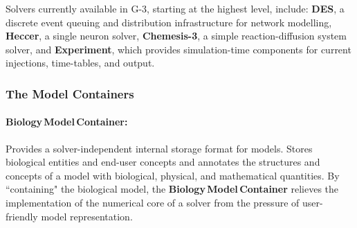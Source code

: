\documentclass[11pt,3p,twocolumn]{JMN}
\begin{document}
Solvers currently available in G-3, starting at the highest level, include: {\bf DES}, a discrete event queuing and distribution infrastructure for network modelling, {\bf Heccer}, a single neuron solver, {\bf Chemesis-3}, a simple reaction-diffusion system solver, and {\bf Experiment}, which provides simulation-time components for current injections, time-tables, and output.




\subsubsection{The Model Containers}

\paragraph{Biology\,Model\,Container:} Provides a solver-independent internal storage format for models. Stores biological entities and end-user concepts and annotates the structures and concepts of a model with biological, physical, and mathematical quantities. By ``containing" the biological model, the {\bf Biology\,Model\,Container} relieves the implementation of the numerical core of a solver from the pressure of user-friendly model representation.
\end{document}
